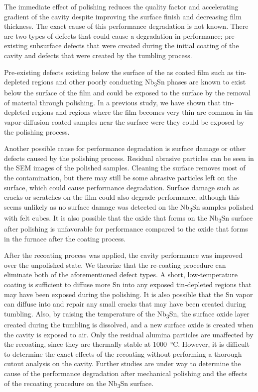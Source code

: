 The immediate effect of polishing reduces the quality factor and accelerating gradient of the cavity despite improving the surface finish and decreasing film thickness. The exact cause of this performance degradation is not known. There are two types of defects that could cause a degradation in performance; pre-existing subsurface defects that were created during the initial coating of the cavity and defects that were created by the tumbling process.

Pre-existing defects existing below the surface of the as coated film such as tin-depleted regions\cite{lee2018atomic} and other poorly conducting Nb\textsubscript{3}Sn phases are known to exist below the surface of the film and could be exposed to the surface by the removal of material through polishing. In a previous study, we have shown that tin-depleted regions and regions where the film becomes very thin are common in tin vapor-diffusion coated samples near the surface were they could be exposed by the polishing process\cite{10073616}. 

Another possible cause for performance degradation is surface damage or other defects caused by the polishing process. Residual abrasive particles can be seen in the SEM images of the polished samples. Cleaning the surface removes most of the contamination, but there may still be some abrasive particles left on the surface, which could cause performance degradation. Surface damage such as cracks or scratches on the film could also degrade performance, although this seems unlikely as no surface damage was detected on the Nb\textsubscript{3}Sn samples polished with felt cubes. It is also possible that the oxide that forms on the Nb\textsubscript{3}Sn surface after polishing is unfavorable for performance compared to the oxide that forms in the furnace after the coating process.

After the recoating process was applied, the cavity performance was improved over the unpolished state. We theorize that the re-coating procedure can eliminate both of the aforementioned defect types. A short, low-temperature coating is sufficient to diffuse more Sn into any exposed tin-depleted regions that may have been exposed during the polishing. It is also possible that the Sn vapor can diffuse into and repair any small cracks that may have been created during tumbling. Also, by raising the temperature of the Nb\textsubscript{3}Sn, the surface oxide layer created during the tumbling is dissolved, and a new surface oxide is created when the cavity is exposed to air. Only the residual alumina particles are unaffected by the recoating, since they are thermally stable at 1000~\unit{\celsius}. However, it is difficult to determine the exact effects of the recoating without performing a thorough cutout analysis on the cavity. Further studies are under way to determine the cause of the performance degradation after mechanical polishing and the effects of the recoating procedure on the Nb\textsubscript{3}Sn surface.

